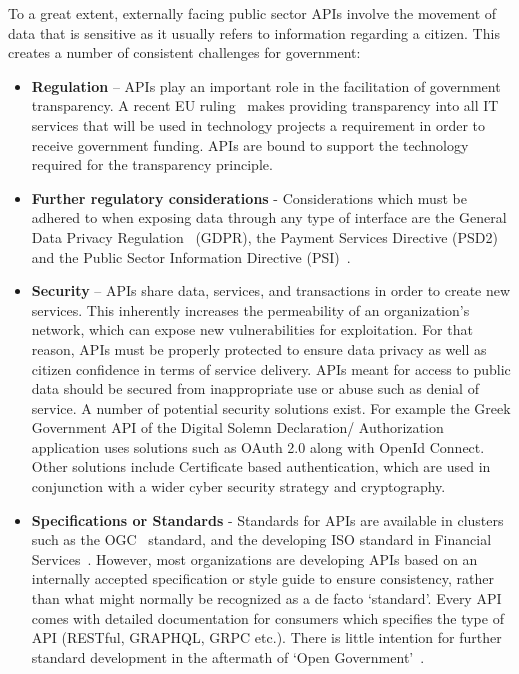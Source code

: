 To a great extent, externally facing public sector APIs involve the movement
of data that is sensitive as it usually refers to information regarding
a citizen. This creates a number of consistent challenges for government:
\begin{itemize}
	\item \textbf{Regulation} – APIs play an important role in the facilitation of
	government transparency. A recent EU ruling~\citep{eu_funding} makes providing
	transparency into all IT services that will be used in technology projects
	a requirement in order to receive government funding. APIs are bound to support the
	technology required for the transparency principle.
	
	\item \textbf{Further regulatory considerations} - Considerations which
	must be adhered to when	exposing data through any type of interface are
	the General Data Privacy Regulation~\cite{eu_gdpr} (GDPR), the Payment
	Services Directive	(PSD2)~\citep{eu_payment_directives} and the Public Sector Information
	Directive (PSI)~\citep{public_sector_info}.
	
	\item \textbf{Security} – APIs share data, services, and transactions in order to create new services. This inherently increases the permeability of an
	organization’s network, which can expose new vulnerabilities for
	exploitation. For that reason, APIs must be properly protected to ensure data
	privacy as well as citizen confidence in terms of service delivery.
	APIs meant for access to public data should be secured from inappropriate
	use or abuse such as denial of service. A number of potential security solutions exist.
	For example the Greek Government API of the Digital Solemn Declaration/ Authorization
	application uses solutions such as OAuth 2.0 along with OpenId Connect. Other solutions
	include Certificate based authentication, which are used in conjunction with a wider cyber security strategy and cryptography.
	
	\item \textbf{Specifications or Standards} - Standards for APIs are available in
	clusters such as the OGC~\citep{open_geospatial_consortium} standard, and the developing ISO
	standard in Financial Services~\cite{iso}. However, most organizations are
	developing APIs based on an internally accepted specification or style guide
	to ensure consistency, rather than what might normally be recognized as
	a de facto ‘standard’. Every API comes with detailed documentation for
	consumers which	specifies the type of API	(RESTful, GRAPHQL,
	GRPC etc.). There is little intention for further standard
	development in the aftermath of ‘Open Government’~\citep{interface_standardisation}.
\end{itemize}

